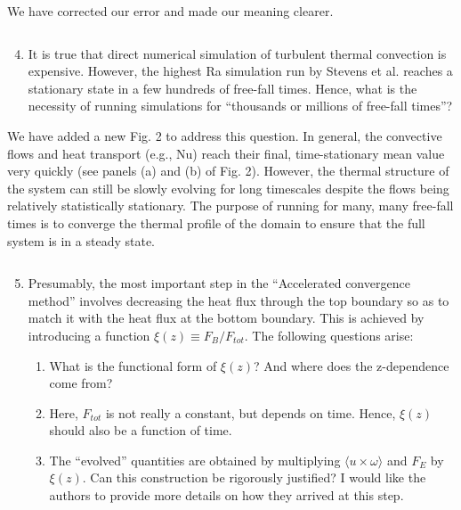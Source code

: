 \documentclass[aps, 11pt, singlecolumn]{revtex4-1} %
\begin{document}
\begin{singlespace}
We have corrected our error and made our meaning clearer.

\begin{myquotation}
$\,$\\\vspace{-1.25cm}
\begin{enumerate}
\setcounter{enumi}{3}
\item It is true that direct numerical simulation of turbulent thermal convection is expensive. However, the highest Ra simulation run by Stevens et al. reaches a stationary state in a few hundreds of free-fall times. Hence, what is the necessity of running simulations for ``thousands or millions of free-fall times''?
\end{enumerate}
\end{myquotation}
We have added a new Fig. 2 to address this question. In general, the convective
flows and heat transport (e.g., Nu) reach their final, time-stationary mean
value very quickly (see panels (a) and (b) of Fig. 2). However, the thermal 
structure of the system can still be slowly evolving for long timescales
despite the flows being relatively statistically stationary. The purpose of
running for many, many free-fall times is to converge the thermal profile of
the domain to ensure that the full system is in a steady state.

\begin{myquotation}
$\,$\\\vspace{-1.25cm}
\begin{enumerate}
\setcounter{enumi}{4}
\item Presumably, the most important step in the “Accelerated convergence method” involves decreasing the heat flux through the top boundary so as to match it with the heat flux at the bottom boundary. This is achieved by introducing a function $\xi(z) \equiv  F_B/F_{tot}$. The following questions arise:
\begin{enumerate}
\item What is the functional form of $\xi(z)$? And where does the z-dependence come from?
\item Here, $F_{tot}$ is not really a constant, but depends on time. Hence, $\xi(z)$ should also be a function of time.
\item The ``evolved'' quantities are obtained by multiplying $\langle u \times \omega \rangle$ and $F_E$ by $\xi(z)$. Can this construction be rigorously justified? I would like the authors to provide more details on how they arrived at this step.
\end{enumerate}
\end{enumerate}
\end{myquotation}


\end{singlespace}
\end{document}
